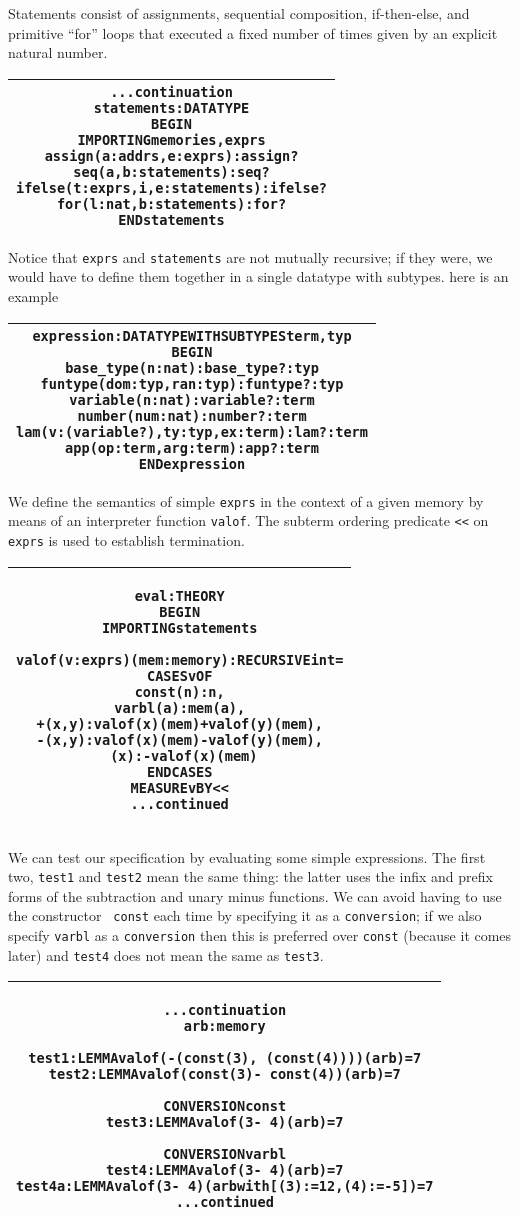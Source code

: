 \documentclass[11pt,twoside]{article}
\makeatletter
\def\sessionsize{\small}
\newlength{\hsbw}
\newenvironment{session}{\begin{flushleft}
  \def\baselinestretch{1}
 \setlength{\hsbw}{\linewidth}
 \addtolength{\hsbw}{-\arrayrulewidth}
 \addtolength{\hsbw}{-\tabcolsep}
 \begin{tabular}{@{}|c@{}|@{}}\hline 
 \begin{minipage}[b]{\hsbw}
 \begingroup\sessionsize\vspace*{1.2ex}\begin{alltt}}{\end{alltt}\endgroup\end{minipage}\\ \hline
 \end{tabular}
 \end{flushleft}}
\makeatother
\begin{document}
Statements consist of assignments, sequential composition,
if-then-else, and primitive ``for'' loops that executed a fixed number
of times given by an explicit natural number.

\begin{session}
...continuation
statements: DATATYPE
BEGIN
 IMPORTING memories, exprs
  assign(a:addrs, e:exprs): assign?
  seq(a,b: statements): seq?
  ifelse(t: exprs, i,e:statements): ifelse?
  for(l: nat, b:statements): for?
END statements
\end{session}

Notice that {\tt exprs} and {\tt statements} are not mutually
recursive; if they were, we would have to define them together in a
single datatype with subtypes.   here is an example

\begin{session}
expression: DATATYPE WITH SUBTYPES term, typ
BEGIN
  base_type(n:nat): base_type? : typ
  funtype(dom: typ, ran: typ): funtype? : typ
  variable(n:nat): variable? : term
  number(num:nat): number? : term
  lam(v: (variable?), ty: typ, ex: term): lam? : term
  app(op: term, arg: term): app? : term
END expression
\end{session}

We define the semantics of simple {\tt exprs} in the context of a given
memory by means of an interpreter function {\tt valof}.  The subterm
ordering predicate {\tt <<} on {\tt exprs} is used to establish
termination.

\begin{session}
eval: THEORY
BEGIN
  IMPORTING statements

  valof(v: exprs)(mem: memory): RECURSIVE int =
    CASES v OF
      const(n): n,
      varbl(a): mem(a),
      +(x,y):   valof(x)(mem) + valof(y)(mem),
      -(x,y):   valof(x)(mem) - valof(y)(mem),
      ~(x):     - valof(x)(mem)
    ENDCASES
  MEASURE  v BY <<
...continued
\end{session}

We can test our specification by evaluating some simple expressions.
The first two, {\tt test1} and {\tt test2} mean the same thing: the
latter uses the infix and prefix forms of the subtraction and unary
minus functions.  We can avoid having to use the constructor {\tt
const} each time by specifying it as a {\tt conversion}; if we also
specify {\tt varbl} as a {\tt conversion} then this is preferred over
{\tt const} (because it comes later) and {\tt test4} does not mean the
same as {\tt test3}.

\begin{session}
...continuation
  arb: memory

  test1: LEMMA valof(-(const(3), ~(const(4))))(arb) = 7
  test2: LEMMA valof(const(3) - ~const(4))(arb) = 7

  CONVERSION const
  test3: LEMMA valof(3 - ~4)(arb) = 7

  CONVERSION varbl
  test4:  LEMMA valof(3 - ~4)(arb) = 7
  test4a: LEMMA valof(3 - ~4)(arb with [(3):=12, (4):=-5]) = 7
...continued
\end{session}
\end{document}
